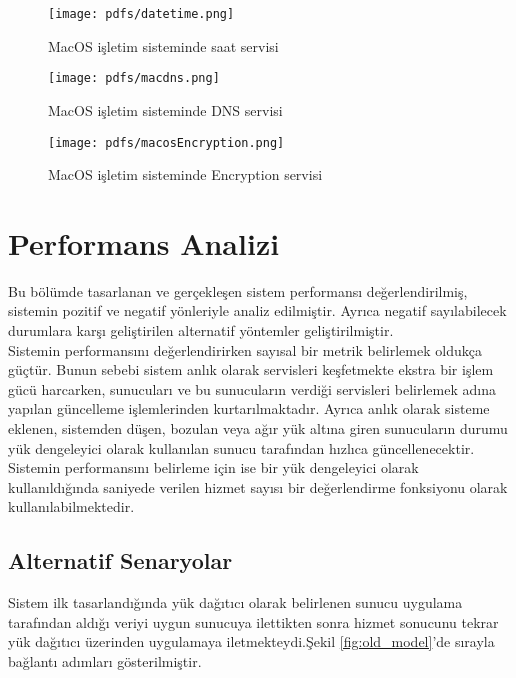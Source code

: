 \documentclass[12pt]{article}
\begin{document}
\begin{justify}
\begin{figure}[H]
    \centering
    \texttt{[image: pdfs/datetime.png]}
    \caption{MacOS işletim sisteminde saat servisi}
    \label{fig:date_time}
\end{figure}

\begin{figure}[H]
    \centering
    \texttt{[image: pdfs/macdns.png]}
    \caption{MacOS işletim sisteminde DNS servisi}
    \label{fig:mac_dns_lookup}
\end{figure}

\begin{figure}[H]
    \centering
    \texttt{[image: pdfs/macosEncryption.png]}
    \caption{MacOS işletim sisteminde Encryption servisi}
    \label{fig:mac_encryption}
\end{figure}

\section{Performans Analizi}
Bu bölümde tasarlanan ve gerçekleşen sistem performansı değerlendirilmiş, sistemin pozitif ve negatif yönleriyle analiz edilmiştir. Ayrıca negatif sayılabilecek durumlara karşı geliştirilen alternatif yöntemler geliştirilmiştir.\\


Sistemin performansını değerlendirirken sayısal bir metrik belirlemek oldukça güçtür. Bunun sebebi sistem anlık olarak servisleri keşfetmekte ekstra bir işlem gücü harcarken, sunucuları ve bu sunucuların verdiği servisleri belirlemek adına yapılan güncelleme işlemlerinden kurtarılmaktadır. Ayrıca anlık olarak sisteme eklenen, sistemden düşen, bozulan veya ağır yük altına giren sunucuların durumu yük dengeleyici olarak kullanılan sunucu tarafından hızlıca güncellenecektir. Sistemin performansını belirleme için ise bir yük dengeleyici olarak kullanıldığında saniyede verilen hizmet sayısı bir değerlendirme fonksiyonu olarak kullanılabilmektedir.\\

\subsection{Alternatif Senaryolar}
Sistem ilk tasarlandığında yük dağıtıcı olarak belirlenen sunucu uygulama tarafından aldığı veriyi uygun sunucuya ilettikten sonra hizmet sonucunu tekrar yük dağıtıcı üzerinden uygulamaya iletmekteydi.Şekil \ref{fig:old_model}'de sırayla bağlantı adımları gösterilmiştir.


\end{justify}
\end{document}
